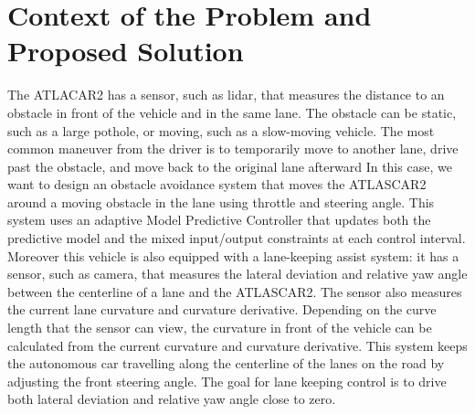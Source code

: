 \documentclass[conference, 11pt]{IEEEtran}
\begin{document}
\section{Context of the Problem and \\  Proposed Solution}
The ATLACAR2 has a sensor, such as lidar, that measures the distance to an obstacle in front of the vehicle and in the same lane. The obstacle can be static, such as a large pothole, or moving, such as a slow-moving vehicle. The most common maneuver from the driver is to temporarily move to another lane, drive past the obstacle, and move back to the original lane afterward
In this case, we want to design an obstacle avoidance system that moves the ATLASCAR2 around a moving obstacle in the lane using throttle and steering angle. This system uses an adaptive Model Predictive Controller that updates both the predictive model and the mixed input/output constraints at each control interval. Moreover this vehicle is also 
equipped with a lane-keeping assist system: it has a sensor, such as camera, that measures the lateral deviation and relative yaw angle between the centerline of a lane and the ATLASCAR2. The sensor also measures the current lane curvature and curvature derivative. Depending on the curve length that the sensor can view, the curvature in front of the vehicle can be calculated from the current curvature and curvature derivative. This system keeps the autonomous car travelling along the centerline of the lanes on the road by adjusting the front steering angle. The goal for lane keeping control is to drive both lateral deviation and relative yaw angle close to zero.
\end{document}
